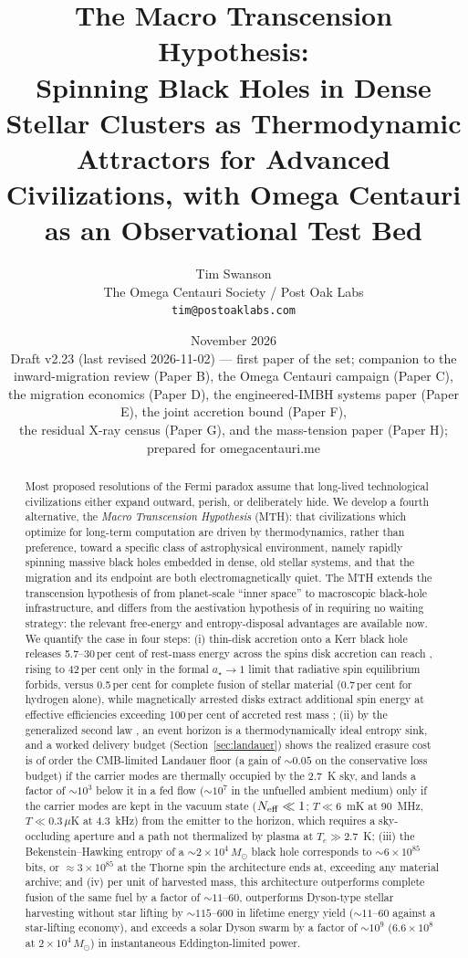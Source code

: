 \documentclass[11pt]{article}
\title{\textbf{The Macro Transcension Hypothesis:\\ Spinning Black Holes in Dense Stellar Clusters as Thermodynamic Attractors for Advanced Civilizations, with Omega Centauri as an Observational Test Bed}}
\author{Tim Swanson\\[2pt]
\small The Omega Centauri Society / Post Oak Labs\\
\small \texttt{tim@postoaklabs.com}}
\date{November 2026 \\[4pt] \small Draft v2.23 (last revised 2026-11-02) --- first paper of the set; companion to the inward-migration review (Paper B), the Omega Centauri campaign (Paper C),\\ \small the migration economics (Paper D), the engineered-IMBH systems paper (Paper E), the joint accretion bound (Paper F),\\ \small the residual X-ray census (Paper G), and the mass-tension paper (Paper H);\\ \small prepared for omegacentauri.me}
\newcommand{\msun}{\ensuremath{M_\odot}}
\newcommand{\astar}{\ensuremath{a_\star}}
\begin{document}
\maketitle

\begin{abstract}
\noindent
Most proposed resolutions of the Fermi paradox assume that long-lived technological civilizations either expand outward, perish, or deliberately hide. We develop a fourth alternative, the \emph{Macro Transcension Hypothesis} (MTH): that civilizations which optimize for long-term computation are driven by thermodynamics, rather than preference, toward a specific class of astrophysical environment, namely rapidly spinning massive black holes embedded in dense, old stellar systems, and that the migration and its endpoint are both electromagnetically quiet. The MTH extends the transcension hypothesis of \citet{Smart2012} from planet-scale ``inner space'' to macroscopic black-hole infrastructure, and differs from the aestivation hypothesis of \citet{Sandberg2016} in requiring no waiting strategy: the relevant free-energy and entropy-disposal advantages are available now. We quantify the case in four steps: (i) thin-disk accretion onto a Kerr black hole releases 5.7--30\,per cent of rest-mass energy across the spins disk accretion can reach \citep{BardeenPressTeukolsky1972,NovikovThorne1973,Thorne1974}, rising to 42\,per cent only in the formal $\astar \to 1$ limit that radiative spin equilibrium forbids, versus 0.5\,per cent for complete fusion of stellar material (0.7\,per cent for hydrogen alone), while magnetically arrested disks extract additional spin energy at effective efficiencies exceeding 100\,per cent of accreted rest mass \citep{Tchekhovskoy2011}; (ii) by the generalized second law \citep{Bekenstein1974}, an event horizon is a thermodynamically ideal entropy sink, and a worked delivery budget (Section~\ref{sec:landauer}) shows the realized erasure cost is of order the CMB-limited Landauer floor (a gain of $\sim 0.05$ on the conservative loss budget) if the carrier modes are thermally occupied by the 2.7~K sky, and lands a factor of $\sim 10^{3}$ below it in a fed flow ($\sim 10^{7}$ in the unfuelled ambient medium) only if the carrier modes are kept in the vacuum state ($N_{\rm eff}\ll1$; $T\ll6$~mK at 90~MHz, $T\ll0.3\,\mu$K at 4.3~kHz) from the emitter to the horizon, which requires a sky-occluding aperture and a path not thermalized by plasma at $T_e \gg 2.7$~K; (iii) the Bekenstein--Hawking entropy of a $\sim 2\times10^{4}\,\msun$ black hole corresponds to $\sim 6\times10^{85}$ bits, or $\approx 3\times10^{85}$ at the Thorne spin the architecture ends at, exceeding any material archive; and (iv) per unit of harvested mass, this architecture outperforms complete fusion of the same fuel by a factor of $\sim 11$--$60$, outperforms Dyson-type stellar harvesting without star lifting by $\sim 115$--$600$ in lifetime energy yield ($\sim 11$--$60$ against a star-lifting economy), and exceeds a solar Dyson swarm by a factor of $\sim 10^{9}$ ($6.6\times10^{8}$ at $2\times10^{4}\,\msun$) in instantaneous Eddington-limited power.


\end{abstract}
\end{document}
